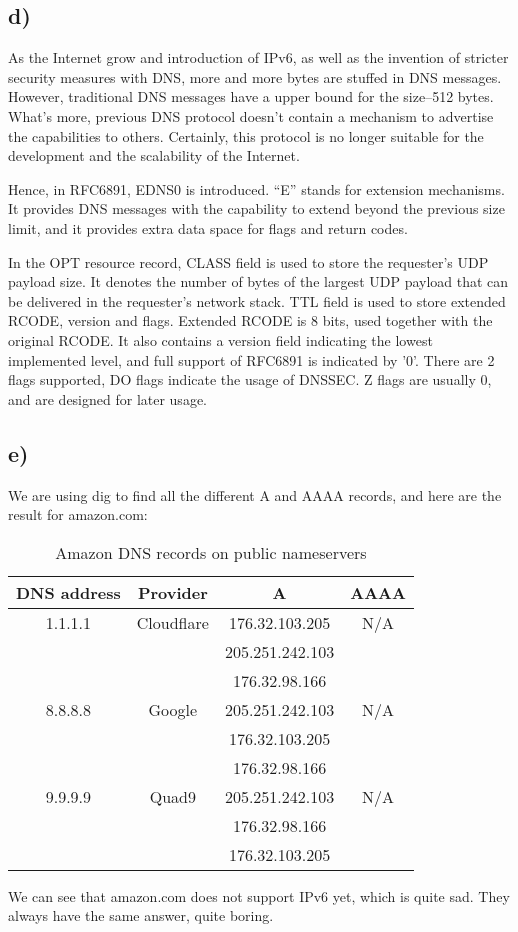 \documentclass{article}
\begin{document}
\subsection*{d)}
As the Internet grow and introduction of IPv6, as well as the invention of
stricter security measures with DNS, more and more bytes are stuffed in DNS
messages. However, traditional DNS messages have a upper bound for the size--512
bytes. What's more, previous DNS protocol doesn't contain a mechanism to
advertise the capabilities to others. Certainly, this protocol is no longer
suitable for the development and the scalability of the Internet.

Hence, in RFC6891, EDNS0 is introduced. ``E'' stands for extension mechanisms.
It provides DNS messages with the capability to extend beyond the previous size
limit, and it provides extra data space for flags and return codes.

In the OPT resource record, CLASS field is used to store the requester's UDP
payload size. It denotes the number of bytes of the largest UDP payload that can
be delivered in the requester's network stack. TTL field is used to store
extended RCODE, version and flags. Extended RCODE is 8 bits, used together with the
original RCODE. It also contains a version field indicating the lowest
implemented level, and full support of RFC6891 is indicated by '0'. There are 2
flags supported, DO flags indicate the usage of DNSSEC. Z flags are usually 0,
and are designed for later usage.
\subsection*{e)}
We are using dig to find all the different A and AAAA records, and here are the
result for amazon.com:
\begin{table}[H]
  \centering
\begin{tabular}{|c|c|c|c|}
  \hline
  DNS address & Provider & A & AAAA \\
  \hline
  1.1.1.1 & Cloudflare & 176.32.103.205 & N/A \\
              & & 205.251.242.103  & \\
  & & 176.32.98.166  & \\
  \hline
  8.8.8.8 & Google & 205.251.242.103 & N/A \\
              & & 176.32.103.205 & \\
              & & 176.32.98.166 & \\
  \hline
  9.9.9.9 & Quad9 & 205.251.242.103 & N/A \\
              & & 176.32.98.166 & \\
  & & 176.32.103.205 & \\
  \hline

\end{tabular}
\caption{Amazon DNS records on public nameservers}
\end{table}
We can see that amazon.com does not support IPv6 yet, which is quite sad. They
always have the same answer, quite boring.
\end{document}
